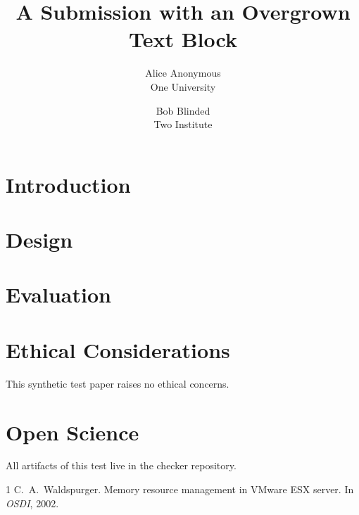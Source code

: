 \documentclass[letterpaper,twocolumn,10pt]{article}
\date{}
\title{\Large \bf A Submission with an Overgrown Text Block}
\author{{\rm Alice Anonymous}\\One University \and {\rm Bob Blinded}\\Two Institute}
\begin{document}
\maketitle

\begin{abstract}
\lipsum[1][1-5]
\end{abstract}

\section{Introduction}
\lipsum[2-20]

\section{Design}
\lipsum[21-45]

\section{Evaluation}
\lipsum[46-70]

\appendix
\section*{Ethical Considerations}
This synthetic test paper raises no ethical concerns.

\section*{Open Science}
All artifacts of this test live in the checker repository.

\begin{thebibliography}{1}
 C.~A.\ Waldspurger. Memory resource management in VMware ESX
  server. In \emph{OSDI}, 2002.
\end{thebibliography}
\end{document}
